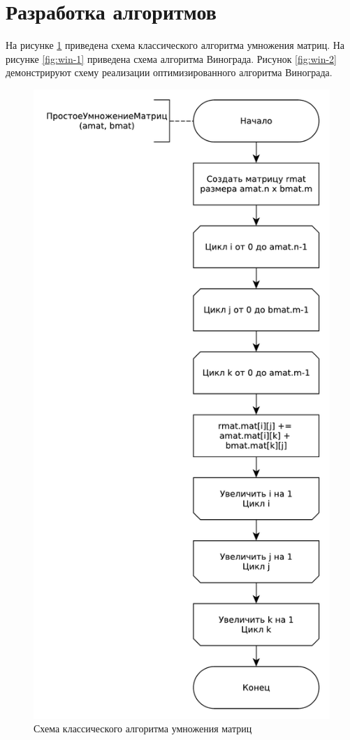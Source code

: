 \section{Разработка алгоритмов}
На рисунке \ref{fig:alg} приведена схема классического алгоритма умножения матриц. На рисунке \ref{fig:win-1} приведена схема алгоритма Винограда. Рисунок  
\ref{fig:win-2} демонстрируют схему реализации оптимизированного алгоритма Винограда.\newpage

\begin{figure}[ht!]
	\centering
	\includegraphics[width=0.65\linewidth]{assets/mtx-alg.pdf}
	\caption{Схема классического алгоритма умножения матриц}
	\label{fig:alg}
\end{figure}
